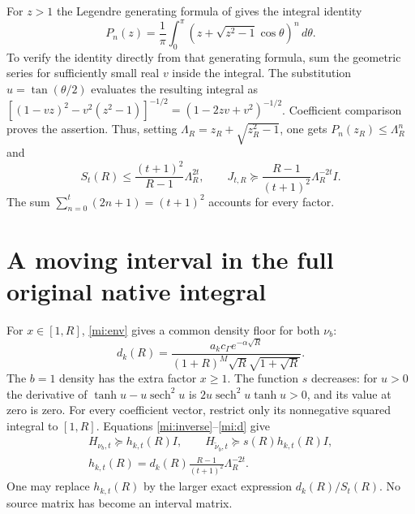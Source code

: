 \documentclass[11pt]{article}
\begin{document}
For $z>1$ the Legendre generating formula of
\cite{DLMF18} gives the integral identity
\[
 P_n(z)=\frac1\pi\int_0^\pi
        (z+\sqrt{z^2-1}\cos\theta)^n\,d\theta.
\]
To verify the identity directly from that generating formula, sum
the geometric series for sufficiently small real $v$ inside the
integral. The substitution $u=\tan(\theta/2)$ evaluates the resulting
integral as
$[(1-vz)^2-v^2(z^2-1)]^{-1/2}=(1-2zv+v^2)^{-1/2}$.
Coefficient comparison proves the assertion. Thus, setting
$\Lambda_R=z_R+\sqrt{z_R^2-1}$, one gets
$P_n(z_R)\le\Lambda_R^n$ and
\begin{equation}\tag{MI6}\label{mi:intervalclosed}
 S_t(R)\le\frac{(t+1)^2}{R-1}\Lambda_R^{2t},
 \qquad J_{t,R}\succeq
 \frac{R-1}{(t+1)^2}\Lambda_R^{-2t}I.
\end{equation}
The sum $\sum_{n=0}^t(2n+1)=(t+1)^2$ accounts for every factor.

\section{A moving interval in the full original native integral}

For $x\in[1,R]$, \eqref{mi:env} gives a common density floor for
both $\nu_b$:
\begin{equation}\tag{MI7}\label{mi:d}
 d_k(R)=\frac{a_kc_\Gamma e^{-\alpha\sqrt R}}
 {(1+R)^M\sqrt R\sqrt{1+\sqrt R}}.
\end{equation}
The $b=1$ density has the extra factor $x\ge1$. The function $s$
decreases: for $u>0$ the derivative of
$\tanh u-u\operatorname{sech}^2u$ is
$2u\operatorname{sech}^2u\tanh u>0$, and its value at zero is zero.
For every coefficient vector, restrict only its nonnegative squared
integral to $[1,R]$. Equations \eqref{mi:inverse}--\eqref{mi:d} give
\begin{equation}\tag{MI8}\label{mi:floor}
 \begin{gathered}
 H_{\nu_b,t}\succeq h_{k,t}(R)I,\qquad
 H_{\widetilde\nu_b,t}\succeq s(R)h_{k,t}(R)I,\\
 h_{k,t}(R)=d_k(R)\frac{R-1}{(t+1)^2}\Lambda_R^{-2t}.
 \end{gathered}
\end{equation}
One may replace $h_{k,t}(R)$ by the larger exact expression
$d_k(R)/S_t(R)$. No source matrix has become an interval matrix.
\end{document}
